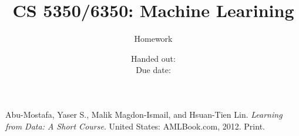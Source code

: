 \documentclass[12pt, fullpage,letterpaper]{article}
\title{CS 5350/6350: Machine Learining \semester}
\author{Homework \assignmentId}
\date{Handed out: \releaseDate\\
  Due date: \dueDate}
\begin{document}
\maketitle













\begin{thebibliography}{1}
Abu-Mostafa, Yaser S., Malik Magdon-Ismail, and Hsuan-Tien Lin. \textit{Learning from Data: A Short Course}. United States: AMLBook.com, 2012. Print.

\end{thebibliography}
\end{document}

